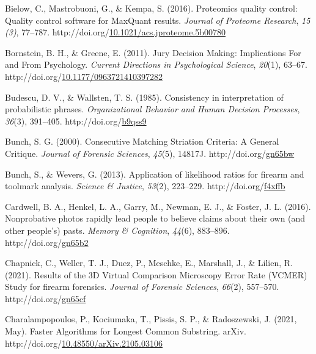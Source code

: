 \documentclass[print]{nuthesis}
\newlength{\cslhangindent}
\newenvironment{CSLReferences}[2]%
{\setlength{\parindent}{0pt}%
\everypar{\setlength{\hangindent}{\cslhangindent}}\ignorespaces}%
{\par}
\begin{document}
\begin{CSLReferences}{1}{0}
\leavevmode{}%
Bielow, C., Mastrobuoni, G., \& Kempa, S. (2016). Proteomics quality control: Quality control software for MaxQuant results. \emph{Journal of Proteome Research}, \emph{15 (3)}, 77--787. http://doi.org/\href{https://doi.org/10.1021/acs.jproteome.5b00780}{10.1021/acs.jproteome.5b00780}

\leavevmode{}%
Bornstein, B. H., \& Greene, E. (2011). Jury {Decision} {Making}: {Implications} {For} and {From} {Psychology}. \emph{Current Directions in Psychological Science}, \emph{20}(1), 63--67. http://doi.org/\href{https://doi.org/10.1177/0963721410397282}{10.1177/0963721410397282}

\leavevmode{}%
Budescu, D. V., \& Wallsten, T. S. (1985). Consistency in interpretation of probabilistic phrases. \emph{Organizational Behavior and Human Decision Processes}, \emph{36}(3), 391--405. http://doi.org/\href{https://doi.org/b9qss9}{b9qss9}

\leavevmode{}%
Bunch, S. G. (2000). Consecutive {Matching} {Striation} {Criteria}: {A} {General} {Critique}. \emph{Journal of Forensic Sciences}, \emph{45}(5), 14817J. http://doi.org/\href{https://doi.org/gn65bw}{gn65bw}

\leavevmode{}%
Bunch, S., \& Wevers, G. (2013). Application of likelihood ratios for firearm and toolmark analysis. \emph{Science \& Justice}, \emph{53}(2), 223--229. http://doi.org/\href{https://doi.org/f4xffb}{f4xffb}

\leavevmode{}%
Cardwell, B. A., Henkel, L. A., Garry, M., Newman, E. J., \& Foster, J. L. (2016). Nonprobative photos rapidly lead people to believe claims about their own (and other people's) pasts. \emph{Memory \& Cognition}, \emph{44}(6), 883--896. http://doi.org/\href{https://doi.org/gn65b2}{gn65b2}

\leavevmode{}%
Chapnick, C., Weller, T. J., Duez, P., Meschke, E., Marshall, J., \& Lilien, R. (2021). Results of the {3D} {Virtual} {Comparison} {Microscopy} {Error} {Rate} ({VCMER}) {Study} for firearm forensics. \emph{Journal of Forensic Sciences}, \emph{66}(2), 557--570. http://doi.org/\href{https://doi.org/gn65cf}{gn65cf}

\leavevmode{}%
Charalampopoulos, P., Kociumaka, T., Pissis, S. P., \& Radoszewski, J. (2021, May). Faster {Algorithms} for {Longest} {Common} {Substring}. arXiv. http://doi.org/\href{https://doi.org/10.48550/arXiv.2105.03106}{10.48550/arXiv.2105.03106}


\end{CSLReferences}
\end{document}
